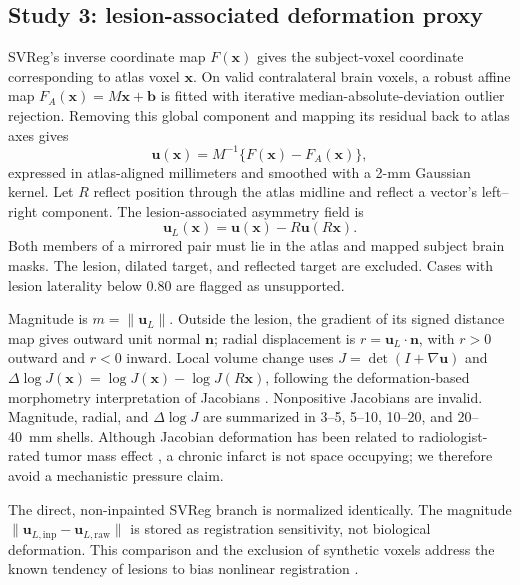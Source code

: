 \documentclass[runningheads]{llncs}
\newcommand{\logJ}{\Delta\!\log J}
\newcommand{\vect}[1]{\boldsymbol{#1}}
\begin{document}
\subsection{Study 3: lesion-associated deformation proxy}
SVReg's inverse coordinate map $F(\vect{x})$ gives the subject-voxel coordinate
corresponding to atlas voxel $\vect{x}$. On valid contralateral brain voxels, a
robust affine map $F_A(\vect{x})=M\vect{x}+\vect{b}$ is fitted with iterative
median-absolute-deviation outlier rejection. Removing this global component and
mapping its residual back to atlas axes gives
\begin{equation}
 \vect{u}(\vect{x})=M^{-1}\{F(\vect{x})-F_A(\vect{x})\},
 \label{eq:residual}
\end{equation}
expressed in atlas-aligned millimeters and smoothed with a 2-mm Gaussian kernel.
Let $R$ reflect position through the atlas midline and reflect a vector's
left--right component. The lesion-associated asymmetry field is
\begin{equation}
 \vect{u}_{L}(\vect{x})=\vect{u}(\vect{x})-R\vect{u}(R\vect{x}).
 \label{eq:mirror}
\end{equation}
Both members of a mirrored pair must lie in the atlas and mapped subject brain
masks. The lesion, dilated target, and reflected target are excluded. Cases
with lesion laterality below 0.80 are flagged as unsupported.

Magnitude is $m=\|\vect{u}_L\|$. Outside the lesion, the gradient of its signed
distance map gives outward unit normal $\vect{n}$; radial displacement is
$r=\vect{u}_L\cdot\vect{n}$, with $r>0$ outward and $r<0$ inward. Local volume
change uses $J=\det(I+\nabla\vect{u})$ and
$\logJ(\vect{x})=\log J(\vect{x})-\log J(R\vect{x})$, following the
deformation-based morphometry interpretation of Jacobians
\cite{Chung2001}. Nonpositive Jacobians are invalid. Magnitude, radial, and
$\logJ$ are summarized in 3--5, 5--10, 10--20, and 20--40~mm shells. Although
Jacobian deformation has been related to radiologist-rated tumor mass effect
\cite{Zacharaki2009}, a chronic infarct is not space occupying; we therefore
avoid a mechanistic pressure claim.

The direct, non-inpainted SVReg branch is normalized identically. The magnitude
$\|\vect{u}_{L,\mathrm{inp}}-\vect{u}_{L,\mathrm{raw}}\|$ is stored as
registration sensitivity, not biological deformation. This comparison and
the exclusion of synthetic voxels address the known tendency of lesions to
bias nonlinear registration \cite{Brett2001,Sdika2009}.
\end{document}
